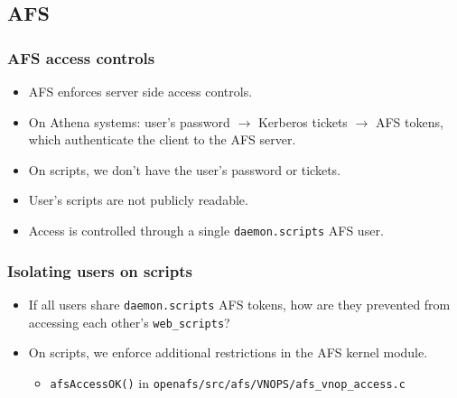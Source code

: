 \subsection{AFS}

\begin{frame}
  \frametitle{AFS access controls}
  \begin{itemize}
  \item AFS enforces server side access controls.
  \item On Athena systems: user's password $\to$ Kerberos tickets
    $\to$ AFS tokens, which authenticate the client to the AFS server.
  \item On scripts, we don't have the user's password or tickets.
  \item User's scripts are not publicly readable.
  \item Access is controlled through a single {\tt daemon.scripts} AFS
    user.
  \end{itemize}
\end{frame}

\begin{frame}
  \frametitle{Isolating users on scripts}
  \begin{itemize}
  \item If all users share {\tt daemon.scripts} AFS tokens, how are
    they prevented from accessing each other's {\tt web\_scripts}?
  \item On scripts, we enforce additional restrictions in the AFS
    kernel module.
    \begin{itemize}
    \item \texttt{afsAccessOK()} in
      \texttt{openafs/src/afs/VNOPS/afs\_vnop\_access.c}
      \end{itemize}
  \end{itemize}
\end{frame}

